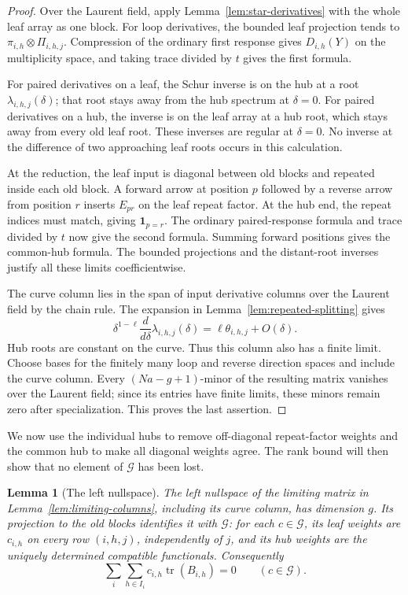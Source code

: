 \documentclass[11pt]{article}
\newtheorem{lemma}[theorem]{Lemma}
\theoremstyle{definition}
\theoremstyle{remark}
\numberwithin{equation}{section}
\begin{document}
\begin{proof}
Over the Laurent field, apply Lemma~\ref{lem:star-derivatives} with
the whole leaf array as one block. For loop derivatives, the
bounded leaf projection tends to
\(\pi_{i,h}\otimes\Pi_{i,h,j}\). Compression of the ordinary
first response gives \(D_{i,h}(Y)\) on the multiplicity space,
and taking trace divided by \(t\) gives the first formula.

For paired derivatives on a leaf, the Schur inverse is on the hub
at a root \(\lambda_{i,h,j}(\delta)\); that root stays away from
the hub spectrum at \(\delta=0\). For paired derivatives on a
hub, the inverse is on the leaf array at a hub root, which stays
away from every old leaf root. These inverses are regular at
\(\delta=0\). No inverse at the difference of two approaching
leaf roots occurs in this calculation.

At the reduction, the leaf input is diagonal between old blocks
and repeated inside each old block. A forward arrow at position
\(p\) followed by a reverse arrow from position \(r\) inserts
\(E_{pr}\) on the leaf repeat factor. At the hub end, the repeat
indices must match, giving \(\mathbf 1_{p=r}\). The ordinary
paired-response formula and trace divided by \(t\) now give the
second formula. Summing forward positions gives the common-hub
formula. The bounded projections and the distant-root inverses
justify all these limits coefficientwise.

The curve column lies in the span of input derivative columns over
the Laurent field by the chain rule. The expansion in
Lemma~\ref{lem:repeated-splitting} gives
\[
 \delta^{1-\ell}\frac{d}{d\delta}
       \lambda_{i,h,j}(\delta)
 =\ell\theta_{i,h,j}+O(\delta).
\]
Hub roots are constant on the curve. Thus this column also has a
finite limit. Choose bases for the finitely many loop and reverse
direction spaces and include the curve column. Every
\((Na-g+1)\)-minor of the resulting matrix vanishes over the
Laurent field; since its entries have finite limits, these minors
remain zero after specialization. This proves the last assertion.
\end{proof}

We now use the individual hubs to remove off-diagonal repeat-factor
weights and the common hub to make all diagonal weights agree.
The rank bound will then show that no element of \(\mathcal G\)
has been lost.

\begin{lemma}[The left nullspace]
\label{lem:hub-nullspace}
The left nullspace of the limiting matrix in
Lemma~\ref{lem:limiting-columns}, including its curve column,
has dimension \(g\). Its projection to the old blocks identifies
it with \(\mathcal G\): for each \(c\in\mathcal G\), its leaf
weights are \(c_{i,h}\) on every row \((i,h,j)\), independently
of \(j\), and its hub weights are the uniquely determined
compatible functionals. Consequently
\begin{equation}
 \sum_i\sum_{h\in I_i}c_{i,h}\operatorname{tr}(B_{i,h})=0
 \qquad(c\in\mathcal G).
 \label{eq:error-matrix-trace}
\end{equation}
\end{lemma}
\end{document}
